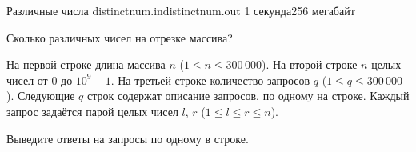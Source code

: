 
\begin{problem}{Различные числа}
{distinctnum.in}{distinctnum.out}
{1 секунда}{256 мегабайт}{}

Сколько различных чисел на отрезке массива?

\InputFile

На первой строке длина массива $n$ ($1 \le n \le 300\,000$).
На второй строке $n$ целых чисел от $0$ до $10^9{-}1$.
На третьей строке количество запросов $q$ ($1 \le q \le 300\,000$).
Следующие $q$ строк содержат описание запросов, по одному на строке.
Каждый запрос задаётся парой целых чисел $l$, $r$ ($1 \le l \le r \le n$).

\OutputFile

Выведите ответы на запросы по одному в строке.

\Examples

\begin{example}
%
\end{example}

\end{problem}
